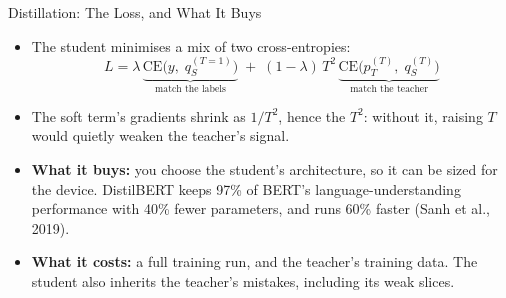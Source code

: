 \begin{frame}{Distillation: The Loss, and What It Buys}

    \begin{itemize}
        \item The student minimises a mix of two cross-entropies:
              \[
                  L = \lambda\, \underbrace{\mathrm{CE}\big(y,\; q_S^{(T=1)}\big)}_{\text{match the labels}}
                  \;+\; (1-\lambda)\, T^2\, \underbrace{\mathrm{CE}\big(p_T^{(T)},\; q_S^{(T)}\big)}_{\text{match the teacher}}
              \]
        \item The soft term's gradients shrink as $1/T^2$, hence the $T^2$: without it, raising $T$ would
              quietly weaken the teacher's signal.
        \item \textbf{What it buys:} you choose the student's architecture, so it can be sized for the
              device. DistilBERT keeps 97\% of BERT's language-understanding performance with 40\% fewer
              parameters, and runs 60\% faster (Sanh et al., 2019).
        \item \textbf{What it costs:} a full training run, and the teacher's training data. The student also
              inherits the teacher's mistakes, including its weak slices.
    \end{itemize}

\end{frame}
